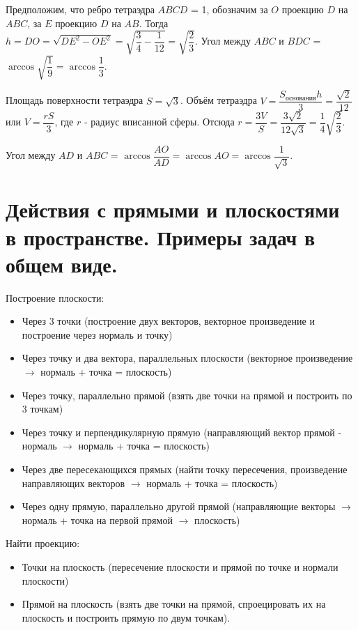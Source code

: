 \documentclass[12pt]{article}
\begin{document}
\begin{sloppypar}
    Предположим, что ребро тетраэдра $ABCD$ = 1, обозначим за $O$ проекцию $D$ на $ABC$, за $E$ проекцию $D$ на $AB$.
    Тогда $h = DO = \sqrt{DE^2 - OE^2} = \sqrt{\dfrac{3}{4} - \dfrac{1}{12}} = \sqrt{\dfrac{2}{3}}$. Угол между $ABC$ и $BDC$ = $\arccos{\sqrt{\dfrac{1}{9}}} = \arccos \dfrac13$.

    Площадь поверхности тетраэдра $S = \sqrt{3}$. Объём тетраэдра $V = \dfrac{S_{\text{основания}}h}{3} = \dfrac{\sqrt{2}}{12}$ или $V = \dfrac{rS}{3}$, где $r$ - радиус вписанной сферы. Отсюда $r = \dfrac{3V}{S} = \dfrac{3\sqrt{2}}{12\sqrt{3}} = \dfrac{1}{4}\sqrt{\dfrac{2}{3}}$.

    Угол между $AD$ и $ABC$ = $\arccos{\dfrac{AO}{AD}} = \arccos{AO} = \arccos{\dfrac{1}{\sqrt{3}}}$.

    \section{Действия с прямыми и плоскостями в пространстве. Примеры задач в общем виде.}
    Построение плоскости:
    \begin{itemize}
        \item Через 3 точки (построение двух векторов, векторное произведение и построение через нормаль и точку)
        \item Через точку и два вектора, параллельных плоскости (векторное произведение $\rightarrow$ нормаль + точка = плоскость)
        \item Через точку, параллельно прямой (взять две точки на прямой и построить по 3 точкам)
        \item Через точку и перпендикулярную прямую (направляющий вектор прямой - нормаль $\rightarrow$ нормаль + точка = плоскость)
        \item Через две пересекающихся прямых (найти точку пересечения, произведение направляющих векторов $\rightarrow$ нормаль + точка = плоскость)
        \item Через одну прямую, параллельно другой прямой (направляющие векторы $\rightarrow$ нормаль + точка на первой прямой $\rightarrow$ плоскость)
    \end{itemize}

    Найти проекцию:
    \begin{itemize}
        \item Точки на плоскость (пересечение плоскости и прямой по точке и нормали плоскости)
        \item Прямой на плоскость (взять две точки на прямой, спроецировать их на плоскость и построить прямую по двум точкам).
    \end{itemize}


\end{sloppypar}
\end{document}
